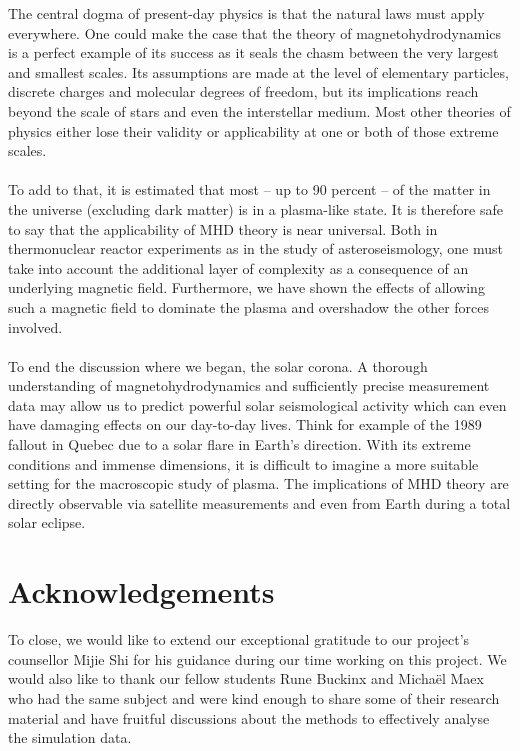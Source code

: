The central dogma of present-day physics is that the natural laws must apply everywhere. 
One could make the case that the theory of magnetohydrodynamics is a perfect example of its success as it seals the chasm between the very largest and smallest scales. 
Its assumptions are made at the level of elementary particles, discrete charges and molecular degrees of freedom, but its implications reach beyond the scale of stars and even the interstellar medium. 
Most other theories of physics either lose their validity or applicability at one or both of those extreme scales.\\
\\
To add to that, it is estimated that most – up to 90 percent \cite{notes-principles-MHD}– of the matter in the universe (excluding dark matter) is in a plasma-like state. 
It is therefore safe to say that the applicability of MHD theory is near universal. 
Both in thermonuclear reactor experiments as in the study of asteroseismology, one must take into account the additional layer of complexity as a consequence of an underlying magnetic field. 
Furthermore, we have shown the effects of allowing such a magnetic field to dominate the plasma and overshadow the other forces involved.\\ 
\\
To end the discussion where we began, the solar corona. 
A thorough understanding of magnetohydrodynamics and sufficiently precise measurement data may allow us to predict powerful solar seismological activity which can even have damaging effects on our day-to-day lives. 
Think for example of the 1989 fallout in Quebec due to a solar flare in Earth’s direction. 
With its extreme conditions and immense dimensions, it is difficult to imagine a more suitable setting for the macroscopic study of plasma. 
The implications of MHD theory are directly observable via satellite measurements \cite{article2} and even from Earth during a total solar eclipse.
 
 

\section*{Acknowledgements}
To close, we would like to extend our exceptional gratitude to our project’s counsellor Mijie Shi for his guidance during our time working on this project. 
We would also like to thank our fellow students Rune Buckinx and Michaël Maex who had the same subject and were kind enough to share some of their research material and have fruitful discussions about the methods to effectively analyse the simulation data.
